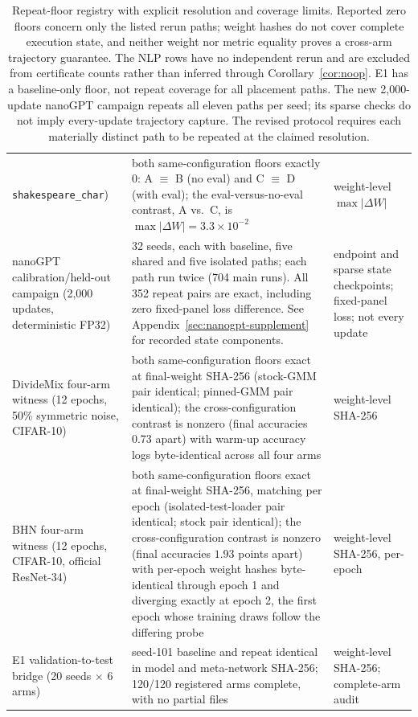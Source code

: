 \documentclass[10pt,letterpaper]{article}
\theoremstyle{remark}
\newcommand{\code}[1]{\texttt{#1}}
\begin{document}
\begin{table}[tbp]
\begin{tabular}{@{}L{4.4cm}L{7.6cm}L{3.2cm}@{}}
\code{shakespeare\_char}) &
both same-configuration floors exactly $0$: A $\equiv$ B (no eval) and
C $\equiv$ D (with eval); the eval-versus-no-eval contrast, A vs.\ C, is
$\max|\Delta W| = 3.3{\times}10^{-2}$ &
weight-level $\max|\Delta W|$ \\
\addlinespace
nanoGPT calibration/held-out campaign (2,000 updates, deterministic FP32) &
32 seeds, each with baseline, five shared and five isolated paths;
each path run twice (704 main runs). All 352 repeat pairs are exact,
including zero fixed-panel loss difference.
See Appendix~\ref{sec:nanogpt-supplement} for recorded state components. &
endpoint and sparse state checkpoints; fixed-panel loss; not every update \\
\addlinespace
DivideMix four-arm witness (12 epochs, 50\% symmetric noise, CIFAR-10) &
both same-configuration floors exact at final-weight SHA-256 (stock-GMM
pair identical; pinned-GMM pair identical); the cross-configuration
contrast is nonzero (final accuracies $0.73$ apart) with warm-up
accuracy logs byte-identical across all four arms &
weight-level SHA-256 \\
\addlinespace
BHN four-arm witness (12 epochs, CIFAR-10, official ResNet-34) &
both same-configuration floors exact at final-weight SHA-256, matching
per epoch (isolated-test-loader pair identical; stock pair identical);
the cross-configuration contrast is nonzero (final accuracies $1.93$
points apart) with per-epoch weight hashes byte-identical through epoch
1 and diverging exactly at epoch 2, the first epoch whose training draws
follow the differing probe &
weight-level SHA-256, per-epoch \\
\addlinespace
E1 validation-to-test bridge (20 seeds $\times$ 6 arms) &
seed-101 baseline and repeat identical in model and meta-network
SHA-256; 120/120 registered arms complete, with no partial files &
weight-level SHA-256; complete-arm audit \\
\bottomrule
\end{tabular}
\caption{Repeat-floor registry with explicit resolution and
coverage limits. Reported zero floors concern only the listed rerun paths;
weight hashes do not cover complete execution state, and neither weight
nor metric equality proves a cross-arm trajectory guarantee. The NLP rows
have no independent rerun and are excluded from certificate counts rather
than inferred through Corollary~\ref{cor:noop}. E1 has a baseline-only floor,
not repeat coverage for all placement paths. The new 2,000-update nanoGPT
campaign repeats all eleven paths per seed; its sparse checks do not imply
every-update trajectory capture. The revised protocol requires each
materially distinct path to be repeated at the claimed resolution.}
\label{tab:floors}
\end{table}
\end{document}
